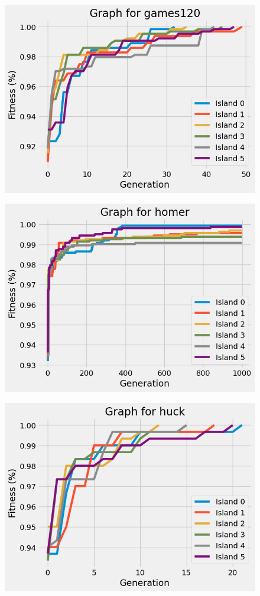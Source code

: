 \documentclass{article}
\begin{document}
\begin{multicols}{2}
\begin{figure}[H]
    \includegraphics[scale=0.45]{imgs/convergence/games120_evolution.png}
\end{figure}
\begin{figure}[H]
    \centering
    \includegraphics[scale=0.45]{imgs/convergence/homer_evolution.png}
\end{figure}
\begin{figure}[H]
    \centering
    \includegraphics[scale=0.45]{imgs/convergence/huck_evolution.png}

\end{figure}
\end{multicols}
\end{document}
